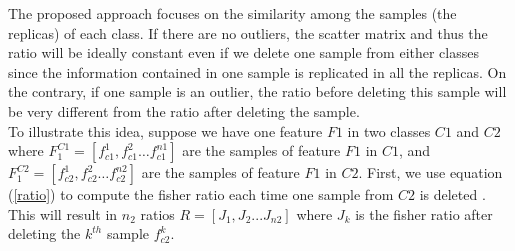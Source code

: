 The proposed approach focuses on the similarity among the samples (the replicas) of each class. If there are no outliers, the scatter matrix and thus the ratio will be ideally constant even if we delete one sample from either classes since the information contained in one sample is replicated in all the replicas. On the contrary, if one sample is an outlier, the ratio before deleting this sample will be very different from the ratio after deleting the sample. \\
\indent To illustrate this idea, suppose we have one feature $F1$ in two classes $C1$ and $C2$ where $F_1^{C1}=[f_{c1}^1,f_{c1}^2 \ldots f_{c1}^{n1} ]$ are the samples of feature $F1$ in $C1$, and $F_1^{C2}=[f_{c2}^1,f_{c2}^2 \ldots f_{c2}^{n2} ]$ are the samples of feature $F1$ in $C2$. First, we use equation (\ref{ratio}) to compute the fisher ratio each time  one sample from $C2$ is deleted . This will result in $n_2$ ratios $R=[J_1, J_2 ... J_{n2}]$ where $J_k$ is the fisher ratio after deleting the $k^{th}$ sample $f_{c2}^k$. \\

